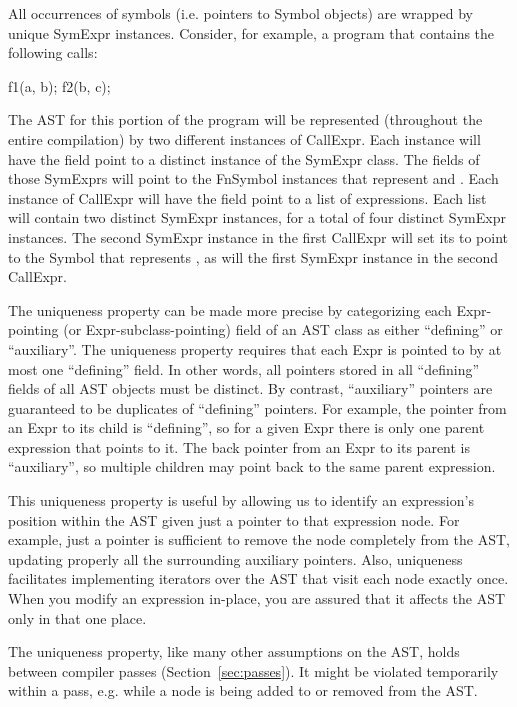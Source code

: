 \documentclass[10pt]{article}
\begin{document}
All occurrences of symbols (i.e. pointers to Symbol objects) are
wrapped by unique SymExpr instances.  Consider, for example,
a program that contains the following calls:
\begin{chapel}
f1(a, b);
f2(b, c);
\end{chapel}
The AST for this portion of the program will be represented
(throughout the entire compilation) by two different instances of
CallExpr.  Each instance will have the  field point to a
distinct instance of the SymExpr class.  The  fields of those SymExprs will
point to the FnSymbol instances that represent  and
.  Each instance of CallExpr will have the  field
point to a list of expressions.  Each list will contain two distinct
SymExpr instances, for a total of four distinct SymExpr instances.
The second SymExpr instance in the first CallExpr will set its  to
point to the Symbol that represents , as will the first
SymExpr instance in the second CallExpr.

The uniqueness property can be made more precise by categorizing each
Expr-pointing (or Expr-subclass-pointing) field of an AST class as
either ``defining'' or ``auxiliary''.  The uniqueness property
requires that each Expr is pointed to by at most one ``defining'' field.
In other words, all pointers stored in all ``defining'' fields of all
AST objects must be distinct.  By contrast, ``auxiliary'' pointers
are guaranteed to be duplicates of ``defining'' pointers.
For example, the pointer from an Expr to its child is ``defining'', so
for a given Expr there is only one parent expression that points to
it.  The back pointer from an Expr to its parent is ``auxiliary'', so
multiple children may point back to the same parent expression.

This uniqueness property is useful by allowing us to identify an
expression's position within the AST given just a pointer to that
expression node.  For example, just a pointer is sufficient to remove
the node completely from the AST, updating properly all the
surrounding auxiliary pointers. Also, uniqueness facilitates
implementing iterators over the AST that visit each node exactly once.
When you modify an expression in-place, you are assured that it
affects the AST only in that one place.

The uniqueness property, like many other assumptions on the AST, holds
between compiler passes (Section~\ref{sec:passes}).  It might be
violated temporarily within a pass, e.g. while a node is being added
to or removed from the AST.
\end{document}
